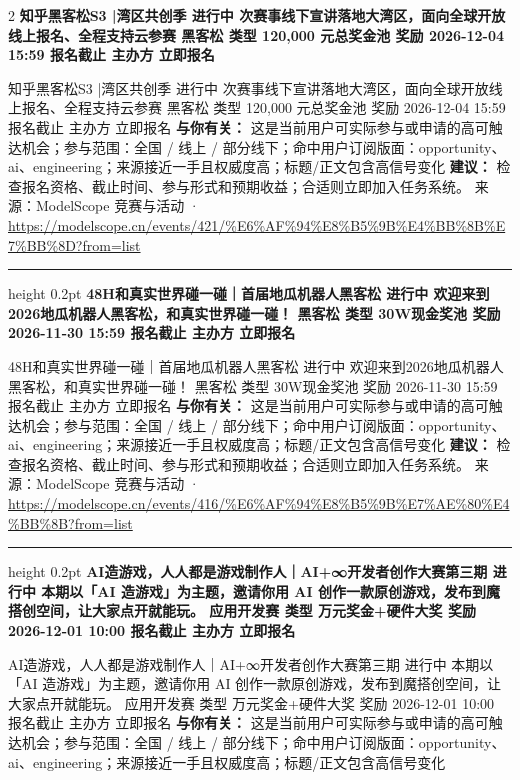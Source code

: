 \documentclass[10.5pt]{ctexart}
\begin{document}
\begin{multicols}{2}
{\large\bfseries 知乎黑客松S3 |湾区共创季 进行中 次赛事线下宣讲落地大湾区，面向全球开放线上报名、全程支持云参赛 黑客松 类型 120,000 元总奖金池 奖励 2026-12-04 15:59 报名截止 主办方 立即报名}\par
知乎黑客松S3 |湾区共创季 进行中 次赛事线下宣讲落地大湾区，面向全球开放线上报名、全程支持云参赛 黑客松 类型 120,000 元总奖金池 奖励 2026-12-04 15:59 报名截止 主办方 立即报名
\textbf{与你有关：} 这是当前用户可实际参与或申请的高可触达机会；参与范围：全国 / 线上 / 部分线下；命中用户订阅版面：opportunity、ai、engineering；来源接近一手且权威度高；标题/正文包含高信号变化
\textbf{建议：} 检查报名资格、截止时间、参与形式和预期收益；合适则立即加入任务系统。
{\footnotesize\color{ormuted} 来源：ModelScope 竞赛与活动 · \url{https://modelscope.cn/events/421/%E6%AF%94%E8%B5%9B%E4%BB%8B%E7%BB%8D?from=list}}
\vspace{2mm}
\hrule height 0.2pt
\vspace{2mm}
{\large\bfseries 48H和真实世界碰一碰｜首届地瓜机器人黑客松 进行中 欢迎来到2026地瓜机器人黑客松，和真实世界碰一碰！ 黑客松 类型 30W现金奖池 奖励 2026-11-30 15:59 报名截止 主办方 立即报名}\par
48H和真实世界碰一碰｜首届地瓜机器人黑客松 进行中 欢迎来到2026地瓜机器人黑客松，和真实世界碰一碰！ 黑客松 类型 30W现金奖池 奖励 2026-11-30 15:59 报名截止 主办方 立即报名
\textbf{与你有关：} 这是当前用户可实际参与或申请的高可触达机会；参与范围：全国 / 线上 / 部分线下；命中用户订阅版面：opportunity、ai、engineering；来源接近一手且权威度高；标题/正文包含高信号变化
\textbf{建议：} 检查报名资格、截止时间、参与形式和预期收益；合适则立即加入任务系统。
{\footnotesize\color{ormuted} 来源：ModelScope 竞赛与活动 · \url{https://modelscope.cn/events/416/%E6%AF%94%E8%B5%9B%E7%AE%80%E4%BB%8B?from=list}}
\vspace{2mm}
\hrule height 0.2pt
\vspace{2mm}
{\large\bfseries AI造游戏，人人都是游戏制作人｜AI+∞开发者创作大赛第三期 进行中 本期以「AI 造游戏」为主题，邀请你用 AI 创作一款原创游戏，发布到魔搭创空间，让大家点开就能玩。 应用开发赛 类型 万元奖金+硬件大奖 奖励 2026-12-01 10:00 报名截止 主办方 立即报名}\par
AI造游戏，人人都是游戏制作人｜AI+∞开发者创作大赛第三期 进行中 本期以「AI 造游戏」为主题，邀请你用 AI 创作一款原创游戏，发布到魔搭创空间，让大家点开就能玩。 应用开发赛 类型 万元奖金+硬件大奖 奖励 2026-12-01 10:00 报名截止 主办方 立即报名
\textbf{与你有关：} 这是当前用户可实际参与或申请的高可触达机会；参与范围：全国 / 线上 / 部分线下；命中用户订阅版面：opportunity、ai、engineering；来源接近一手且权威度高；标题/正文包含高信号变化

\end{multicols}
\end{document}
